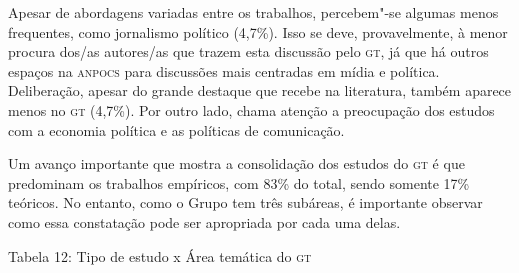 Apesar de abordagens variadas entre os trabalhos, percebem"-se algumas
menos frequentes, como jornalismo político (4,7\%). Isso se deve,
provavelmente, à menor procura dos/as autores/as que trazem esta
discussão pelo \textsc{gt}, já que há outros espaços na \textsc{anpocs} para discussões
mais centradas em mídia e política. Deliberação, apesar do grande
destaque que recebe na literatura, também aparece menos no \textsc{gt} (4,7\%).
Por outro lado, chama atenção a preocupação dos estudos com a economia
política e as políticas de comunicação.

Um avanço importante que mostra a consolidação dos estudos do \textsc{gt} é que
predominam os trabalhos empíricos, com 83\% do total, sendo somente 17\%
teóricos. No entanto, como o Grupo tem três subáreas, é importante
observar como essa constatação pode ser apropriada por cada uma delas.

\begin{center}
Tabela 12: Tipo de estudo x Área temática do \textsc{gt}
\end{center}


